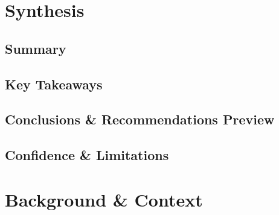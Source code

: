 \documentclass[11pt]{article}
\begin{document}
\section{Synthesis}
%

\subsection{Summary}

\subsection{Key Takeaways}

\subsection{Conclusions \& Recommendations Preview}

\subsection{Confidence \& Limitations}

\section{Background \& Context}
\end{document}
